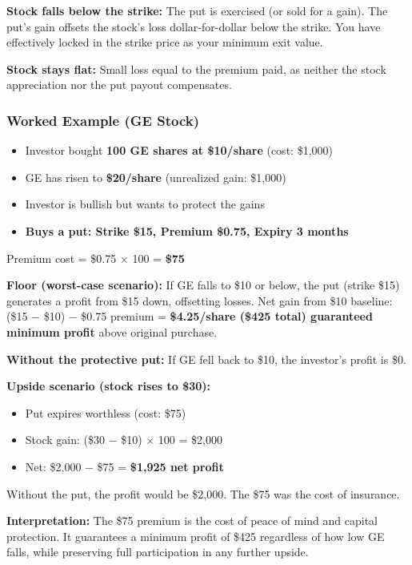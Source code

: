 \documentclass[12pt,openany]{book}
\begin{document}
\textbf{Stock falls below the strike:} The put is exercised (or sold for a gain). The put's gain offsets the stock's loss dollar-for-dollar below the strike. You have effectively locked in the strike price as your minimum exit value.

\textbf{Stock stays flat:} Small loss equal to the premium paid, as neither the stock appreciation nor the put payout compensates.



\subsubsection{Worked Example (GE Stock)}

\begin{itemize}[leftmargin=*]
    \item Investor bought \textbf{100 GE shares at \$10/share} (cost: \$1,000)
    \item GE has risen to \textbf{\$20/share} (unrealized gain: \$1,000)
    \item Investor is bullish but wants to protect the gains
    \item \textbf{Buys a put: Strike \$15, Premium \$0.75, Expiry 3 months}
\end{itemize}

Premium cost = \$0.75 × 100 = \textbf{\$75}

\textbf{Floor (worst-case scenario):}
If GE falls to \$10 or below, the put (strike \$15) generates a profit from \$15 down, offsetting losses. Net gain from \$10 baseline: (\$15 − \$10) − \$0.75 premium = \textbf{\$4.25/share (\$425 total) guaranteed minimum profit} above original purchase.

\textbf{Without the protective put:} If GE fell back to \$10, the investor's profit is \$0.

\textbf{Upside scenario (stock rises to \$30):}
\begin{itemize}[leftmargin=*]
    \item Put expires worthless (cost: \$75)
    \item Stock gain: (\$30 − \$10) × 100 = \$2,000
    \item Net: \$2,000 − \$75 = \textbf{\$1,925 net profit}
\end{itemize}

Without the put, the profit would be \$2,000. The \$75 was the cost of insurance.

\textbf{Interpretation:} The \$75 premium is the cost of peace of mind and capital protection. It guarantees a minimum profit of \$425 regardless of how low GE falls, while preserving full participation in any further upside.
\end{document}
